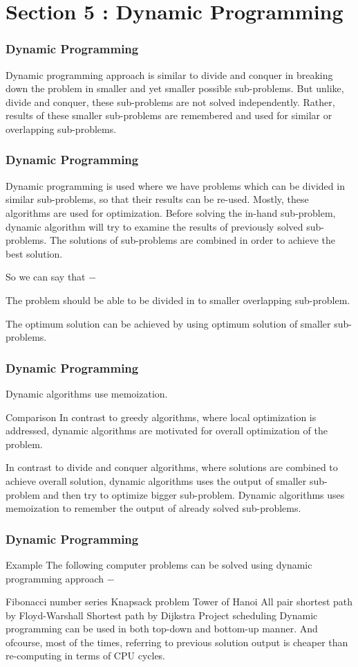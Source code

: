 \documentclass{beamer}
\begin{document}
\section{Section 5 : Dynamic Programming}
\begin{frame}
\frametitle{Dynamic Programming}
\large

Dynamic programming approach is similar to divide and conquer in breaking down the problem in smaller and yet smaller possible sub-problems. But unlike, divide and conquer, these sub-problems are not solved independently. Rather, results of these smaller sub-problems are remembered and used for similar or overlapping sub-problems.
\end{frame}
\begin{frame}
\frametitle{Dynamic Programming}
\large
Dynamic programming is used where we have problems which can be divided in similar sub-problems, so that their results can be re-used. Mostly, these algorithms are used for optimization. Before solving the in-hand sub-problem, dynamic algorithm will try to examine the results of previously solved sub-problems. The solutions of sub-problems are combined in order to achieve the best solution.

So we can say that −

The problem should be able to be divided in to smaller overlapping sub-problem.

The optimum solution can be achieved by using optimum solution of smaller sub-problems.
\end{frame}
\begin{frame}
\frametitle{Dynamic Programming}
\large
Dynamic algorithms use memoization.

Comparison
In contrast to greedy algorithms, where local optimization is addressed, dynamic algorithms are motivated for overall optimization of the problem.

In contrast to divide and conquer algorithms, where solutions are combined to achieve overall solution, dynamic algorithms uses the output of smaller sub-problem and then try to optimize bigger sub-problem. Dynamic algorithms uses memoization to remember the output of already solved sub-problems.
\end{frame}
\begin{frame}
\frametitle{Dynamic Programming}
\large
Example
The following computer problems can be solved using dynamic programming approach −

Fibonacci number series
Knapsack problem
Tower of Hanoi
All pair shortest path by Floyd-Warshall
Shortest path by Dijkstra
Project scheduling
Dynamic programming can be used in both top-down and bottom-up manner. And ofcourse, most of the times, referring to previous solution output is cheaper than re-computing in terms of CPU cycles.
 
\end{frame}
\end{document}
